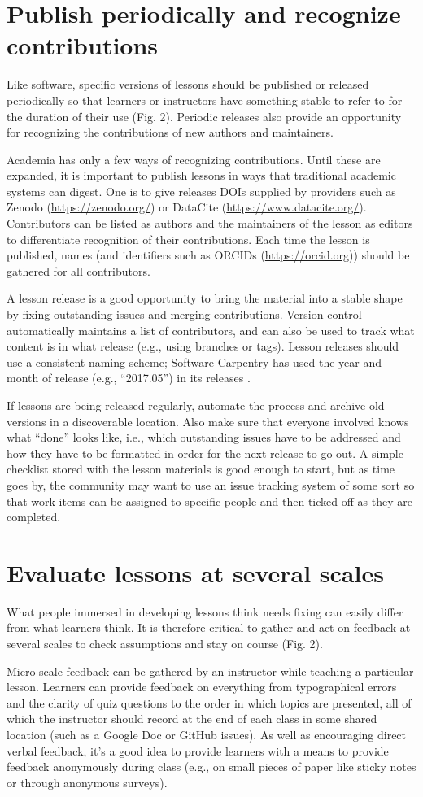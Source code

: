 \documentclass[10pt,letterpaper]{article}
\newcommand{\rulemajor}[2]{\section{#1}\label{#2}}
\begin{document}
\rulemajor{Publish periodically and recognize contributions}{publish}

Like software,
specific versions of lessons should be published or released periodically
so that learners or instructors have something stable to refer to for the duration of their use (Fig. 2).
Periodic releases also provide an opportunity
for recognizing the contributions of new authors and maintainers.

Academia has only a few ways of recognizing contributions.
Until these are expanded,
it is important to publish lessons in ways that traditional academic systems can digest.
One is to give releases DOIs supplied by providers such as Zenodo (\url{https://zenodo.org/})
or DataCite (\url{https://www.datacite.org/}).
Contributors can be listed as authors
and the maintainers of the lesson as editors
to differentiate recognition of their contributions.
Each time the lesson is published,
names (and identifiers such as ORCIDs (\url{https://orcid.org}))
should be gathered for all contributors.

A lesson release is a good opportunity to bring the material into a stable shape
by fixing outstanding issues and merging contributions.
Version control automatically maintains a list of contributors,
and can also be used to track what content is in what release
(e.g., using branches or tags).
Lesson releases should use a consistent naming scheme;
Software Carpentry has used the year and month of release
(e.g., ``2017.05'')
in its releases \cite{shell2015,shell2017}.

If lessons are being released regularly,
automate the process
and archive old versions in a discoverable location.
Also make sure that everyone involved knows what ``done'' looks like,
i.e.,
which outstanding issues have to be addressed
and how they have to be formatted
in order for the next release to go out.
A simple checklist stored with the lesson materials is good enough to start,
but as time goes by,
the community may want to use an issue tracking system of some sort
so that work items can be assigned to specific people
and then ticked off as they are completed.

\rulemajor{Evaluate lessons at several scales}{evaluate}

What people immersed in developing lessons think needs fixing
can easily differ from what learners think.
It is therefore critical to gather and act on feedback at several scales
to check assumptions and stay on course (Fig. 2).

Micro-scale feedback can be gathered by an instructor while teaching a particular lesson.
Learners can provide feedback on everything from typographical errors
and the clarity of quiz questions
to the order in which topics are presented,
all of which the instructor should record at the end of each class
in some shared location (such as a Google Doc or GitHub issues).
As well as encouraging direct verbal feedback,
it's a good idea to provide learners with a means to provide feedback anonymously during class
(e.g., on small pieces of paper like sticky notes or through anonymous surveys).
\end{document}
